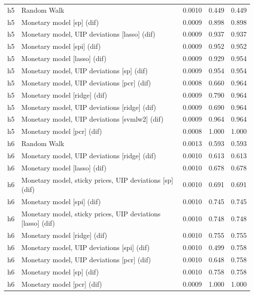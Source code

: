 \begin{ThreePartTable}
\begin{longtable}[t]{cp{5.5cm}ccc}
\addlinespace
h5 & \raggedright Random Walk & 0.0010 & 0.449 & 0.449\\
h5 & \raggedright Monetary model [sp] (dif) & 0.0009 & 0.898 & 0.898\\
h5 & \raggedright Monetary model, UIP deviations [lasso] (dif) & 0.0009 & 0.937 & 0.937\\
h5 & \raggedright Monetary model [spi] (dif) & 0.0009 & 0.952 & 0.952\\
h5 & \raggedright Monetary model [lasso] (dif) & 0.0009 & 0.929 & 0.954\\
h5 & \raggedright Monetary model, UIP deviations [sp] (dif) & 0.0009 & 0.954 & 0.954\\
h5 & \raggedright Monetary model, UIP deviations [pcr] (dif) & 0.0008 & 0.660 & 0.964\\
h5 & \raggedright Monetary model [ridge] (dif) & 0.0009 & 0.790 & 0.964\\
h5 & \raggedright Monetary model, UIP deviations [ridge] (dif) & 0.0009 & 0.690 & 0.964\\
h5 & \raggedright Monetary model, UIP deviations [svmlw2] (dif) & 0.0009 & 0.964 & 0.964\\
h5 & \raggedright Monetary model [pcr] (dif) & 0.0008 & 1.000 & 1.000\\
\addlinespace
h6 & \raggedright Random Walk & 0.0013 & 0.593 & 0.593\\
h6 & \raggedright Monetary model, UIP deviations [ridge] (dif) & 0.0010 & 0.613 & 0.613\\
h6 & \raggedright Monetary model [lasso] (dif) & 0.0010 & 0.678 & 0.678\\
h6 & \raggedright Monetary model, sticky prices, UIP deviations [sp] (dif) & 0.0010 & 0.691 & 0.691\\
h6 & \raggedright Monetary model [spi] (dif) & 0.0010 & 0.745 & 0.745\\
h6 & \raggedright Monetary model, sticky prices, UIP deviations [lasso] (dif) & 0.0010 & 0.748 & 0.748\\
h6 & \raggedright Monetary model [ridge] (dif) & 0.0010 & 0.755 & 0.755\\
h6 & \raggedright Monetary model, UIP deviations [spi] (dif) & 0.0010 & 0.499 & 0.758\\
h6 & \raggedright Monetary model, UIP deviations [pcr] (dif) & 0.0010 & 0.648 & 0.758\\
h6 & \raggedright Monetary model [sp] (dif) & 0.0010 & 0.758 & 0.758\\
h6 & \raggedright Monetary model [pcr] (dif) & 0.0009 & 1.000 & 1.000\\

\end{longtable}
\end{ThreePartTable}
